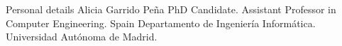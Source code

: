 \begin{rubric}{Personal details}
Alicia Garrido Peña
PhD Candidate. Assistant Professor in Computer Engineering.
Spain
Departamento de Ingeniería Informática. Universidad Autónoma de Madrid.

\end{rubric}